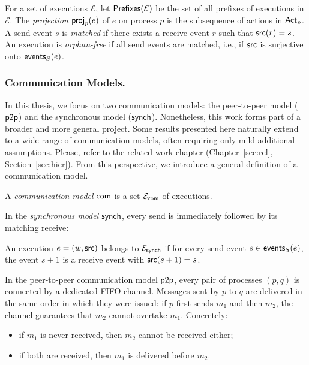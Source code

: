 For a set of executions $\mathcal{E}$, let 
$\prefixclosureof{\mathcal{E}}$ be the set of all prefixes 
of executions in $\mathcal{E}$.  
The \emph{projection} $\projofon{e}{p}$ of $e$ on process $p$  
is the subsequence of actions in $\Actp$.  
A send event $s$ is \emph{matched} if there exists a receive event $r$  
such that $\source(r) = s$.  
An execution is \emph{orphan-free} if all send events are matched,  
i.e., if $\source$ is surjective onto $\sendeventsof{e}$.  

\subsubsection*{Communication Models.}
In this thesis, we focus on two communication models: 
the peer-to-peer model ($\ppmodel$) and the synchronous model ($\synchmodel$).  
Nonetheless, this work forms part of a 
broader and more general project. Some results presented here 
naturally extend to a wide range of communication models, often requiring 
only mild additional assumptions. Please, refer to the related work chapter
(Chapter~\ref{sec:rel}, Section~\ref{sec:hier}).
From this perspective, we introduce a general definition of a communication 
model. 

\bigskip

\begin{definition}\label{def:communication-model}
A \emph{communication model} $\acommunicationmodel$  
is a set $\executionsofmodel{\acommunicationmodel}$ of executions.  
\end{definition}

In the \emph{synchronous model} $\synchmodel$,  
every send is immediately followed by its matching receive:  

\bigskip

\begin{definition}[$\synchmodel$]\label{def:synchronous}
An execution $e = (w,\source)$ belongs to 
$\executionsofmodel{\synchmodel}$ if for every send event 
$s \in \sendeventsof{e}$, the event $s+1$ is a receive event 
with $\source(s+1) = s$.  
\end{definition}

In the peer-to-peer communication model $\ppmodel$, every pair of 
processes $(p,q)$ is connected by a dedicated FIFO channel.  
Messages sent by $p$ to $q$ are delivered in the same order in which 
they were issued: if $p$ first sends $m_1$ and then $m_2$, the channel 
guarantees that $m_2$ cannot overtake $m_1$. Concretely:
\begin{itemize}
    \item if $m_1$ is never received, then $m_2$ cannot be received either;
    \item if both are received, then $m_1$ is delivered before $m_2$.
\end{itemize}

